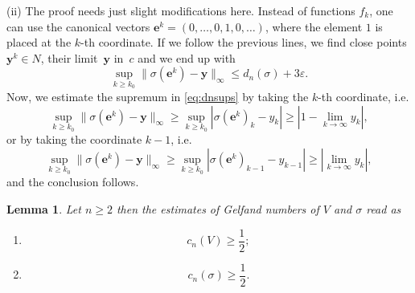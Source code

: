 \documentclass[10pt,reqno]{amsart}
\newtheorem{lemma}[theorem]{Lemma}
\numberwithin{equation}{section}
\let\oldendproof\endproof
\renewenvironment{proof}[1][\proofname]{%
  \oldproof[\bf #1]%
}{\oldendproof}
\def\linf{{c}}
\def\vy{\mathbf{y}}
\def\ve{\mathbf{e}}
\begin{document}
\begin{proof}
(ii) The proof needs just slight modifications here. Instead of functions $f_k$,
one can use the canonical vectors $\ve^k=(0,\ldots,0,1,0,\ldots)$, where
the element $1$ is placed at the $k$-th coordinate. If we follow the previous lines,
we find close points $\vy^k\in N$, their limit~$\vy$ in~$\linf$ and we end up with
\begin{equation} \label{eq:dnsups}
	\sup_{k\ge k_0} \| \sigma(\ve^k) - \vy \|_\infty
		\le d_n(\sigma) + 3\varepsilon.
\end{equation}
Now, we estimate the supremum in \eqref{eq:dnsups} by
taking the $k$-th coordinate, i.e.
\begin{equation*} %
	\sup_{k\ge k_0} \| \sigma(\ve^k) - \vy \|_\infty
	\ge \sup_{k\ge k_0} |\sigma(\ve^k)_k - y_k |
	\ge |1-\lim_{k\to\infty} y_k|,
\end{equation*}
or by taking the coordinate $k-1$, i.e.
\begin{equation*} %
	\sup_{k\ge k_0} \| \sigma(\ve^k) - \vy \|_\infty
	\ge \sup_{k\ge k_0} |\sigma(\ve^k)_{k-1} - y_{k-1} |
	\ge |\lim_{k\to\infty} y_k|,
\end{equation*}
and the conclusion follows.
\end{proof}




\begin{lemma} \label{lemm:Gelfand}
Let $n\ge 2$ then the estimates of Gelfand numbers of $V$ and $\sigma$ read as
\begin{enumerate}[\rm (i)]
\item 
\begin{equation*}
	c_n(V) \ge \frac{1}{2};
\end{equation*}
\item 
\begin{equation*}
	c_n(\sigma) \ge \frac{1}{2}.
\end{equation*}
\end{enumerate}
\end{lemma}
\end{document}

